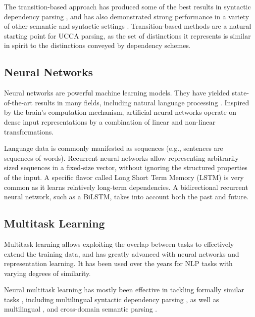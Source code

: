 \documentclass[12pt,a4paper]{report}
\begin{document}
The transition-based approach has produced some of the best
results in syntactic dependency parsing
\citep{kiperwasser2016simple,andor2016globally}, and has also demonstrated
strong performance in a variety of other semantic and syntactic settings
\citep{maier2015discontinuous,damonte-17}.
Transition-based methods are a natural starting point for UCCA parsing,
as the set of distinctions it represents is similar in spirit to the distinctions
conveyed by dependency schemes.


\subsection*{Neural Networks}

Neural networks are powerful machine learning models.
They have yielded state-of-the-art results in many fields,
including natural language processing \citep{goldberg2016primer}.
Inspired by the brain's computation mechanism,
artificial neural networks operate on dense input representations
by a combination of linear and non-linear transformations.

Language data is commonly manifested as sequences
(e.g., sentences are sequences of words).
Recurrent neural networks \citep{elman1990finding} allow representing
arbitrarily sized sequences in a fixed-size vector,
without ignoring the structured properties of the input.
A specific flavor called Long Short Term Memory
(LSTM) is very common as it learns relatively long-term dependencies.
A bidirectional recurrent neural network, such as a BiLSTM,
takes into account both the past and future.


\subsection*{Multitask Learning}

Multitask learning \citep{caruana1998multitask} allows exploiting the overlap between tasks
to effectively extend the training data, 
and has greatly advanced with neural networks and representation learning.
It has been used over the years for NLP tasks with varying degrees of similarity.

Neural multitask learning has mostly been effective in tackling formally similar
tasks \citep{P16-2038},
including
multilingual syntactic dependency parsing \citep{Q16-1031,guo2016exploiting},
as well as multilingual \citep{duong2017multilingual},
and cross-domain semantic parsing \citep{herzig-berant:2017:Short,W17-2607}.
\end{document}
